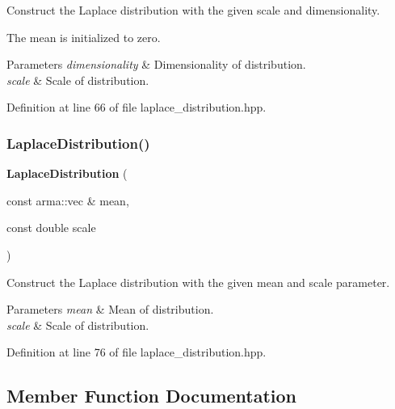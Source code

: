 Construct the Laplace distribution with the given scale and dimensionality. 

The mean is initialized to zero.


\begin{DoxyParams}{Parameters}
{\em dimensionality} & Dimensionality of distribution. \\
\hline
{\em scale} & Scale of distribution. \\
\hline
\end{DoxyParams}


Definition at line 66 of file laplace\+\_\+distribution.\+hpp.

\mbox{\label{classmlpack_1_1distribution_1_1LaplaceDistribution_a4d7d471d63f2b083d0f445eaaac1fc5c}} 
\subsubsection{Laplace\+Distribution()\hspace{0.1cm}{\footnotesize\ttfamily [3/3]}}
{\footnotesize\ttfamily \textbf{ Laplace\+Distribution} (\begin{DoxyParamCaption}\item[{const arma\+::vec \&}]{mean,  }\item[{const double}]{scale }\end{DoxyParamCaption})\hspace{0.3cm}{\ttfamily [inline]}}



Construct the Laplace distribution with the given mean and scale parameter. 


\begin{DoxyParams}{Parameters}
{\em mean} & Mean of distribution. \\
\hline
{\em scale} & Scale of distribution. \\
\hline
\end{DoxyParams}


Definition at line 76 of file laplace\+\_\+distribution.\+hpp.



\subsection{Member Function Documentation}
\mbox{\label{classmlpack_1_1distribution_1_1LaplaceDistribution_a78eda6bfb9e9462afa0fc85e32abe1af}} 
